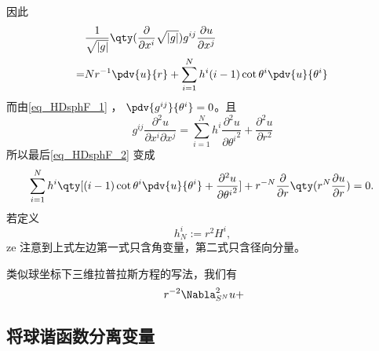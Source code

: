 因此
\begin{equation}
\begin{aligned}
&\frac{1}{\sqrt{ \left\lvert g \right\rvert }} \qty(\frac{\partial }{\partial x^i} \sqrt{ \left\lvert g \right\rvert })g^{ij} \frac{\partial u}{\partial x^j}\\
=&Nr^{-1}\pdv{u}{r}+\sum_{i=1}^{N}h^{i}(i-1)\cot\theta^i\pdv{u}{\theta^i}\\
\end{aligned}~
\end{equation}
而由\autoref{eq_HDsphF_1} ， $\pdv{g^{ij}}{\theta^i}=0$。且
\begin{equation}
g^{ij}\frac{\partial^2 u}{\partial x^i\partial x^j}=\sum_{i=1}^{N}h^{i}\frac{\partial^2 u}{\partial {\theta^i}^2}+\frac{\partial^2 u}{\partial r^2}~
\end{equation}
所以最后\autoref{eq_HDsphF_2} 变成
\begin{equation}
\begin{aligned}
\sum_{i=1}^{N}h^{i}\qty[(i-1)\cot\theta^i\pdv{u}{\theta^i}+\frac{\partial^2 u}{\partial {\theta^i}^2}]+r^{-N}\frac{\partial }{\partial r}\qty(r^{N}\frac{\partial u}{\partial r})=0.
\end{aligned}~
\end{equation}
若定义 
\begin{equation}
h^i_{N}:=r^2H^i,~
\end{equation}
ze
注意到上式左边第一式只含角变量，第二式只含径向分量。

类似球坐标下三维拉普拉斯方程的写法，我们有
\begin{equation}
r^{-2}\Nabla^{2}_{S^N}u+
\end{equation}


\subsection{将球谐函数分离变量}










